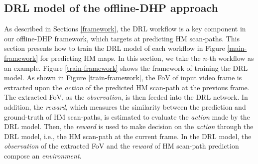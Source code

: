\documentclass[10pt,journal,compsoc]{IEEEtran}
\begin{document}
\subsection{DRL model of the offline-DHP approach}
\label{train}
As described in Sections \ref{framework}, the DRL workflow is a key component in our offline-DHP framework, which targets at predicting HM scan-paths.
This section presents how to train the DRL model of each workflow in Figure \ref{main-framework} for predicting HM maps.
In this section, we take the $n$-th workflow as an example.
Figure \ref{train-framework} shows the framework of training the DRL model.
As shown in Figure \ref{train-framework}, the FoV of input video frame is extracted upon the \textit{action} of the predicted HM scan-path at the previous frame.
The extracted FoV, as the \textit{observation}, is then feeded into the DRL network.
In addition, the \textit{reward}, which measures the similarity between the prediction and ground-truth of HM scan-paths, is estimated to evaluate the \textit{action} made by the DRL model. Then, the \textit{reward} is used to make decision on the \textit{action} through the DRL model, i.e., the HM scan-path at the current frame. In the DRL model, the \textit{observation} of the extracted FoV and the \textit{reward} of HM scan-path prediction compose an \textit{environment}.
\end{document}
